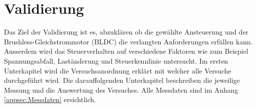 \section{Validierung}\label{sec:Validierung}
Das Ziel der Validierung ist es, abzuklären ob die gewählte Ansteuerung und der Brushless-Gleichstrommotor (BLDC) die verlangten Anforderungen erfüllen kann. Ausserdem wird das Steuerverhalten auf verschiedene Faktoren wie zum Beispiel Spannungsabfall, Laständerung und Steuerkennlinie untersucht.
Im ersten Unterkapitel wird die Versuchsanordnung erklärt mit welcher alle Versuche durchgeführt wird. Die darauffolgenden Unterkapitel beschreiben die jeweilige Messung und die Auswertung des Versuches.
Alle Messdaten sind im Anhang \ref{appsec:Messdaten} ersichtlich.











